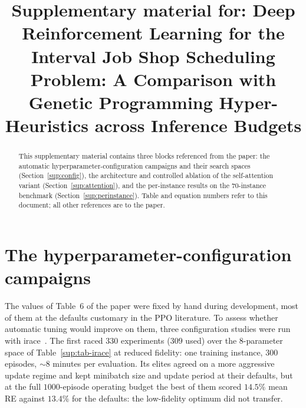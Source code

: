 \documentclass[preprint,12pt]{elsarticle}
\begin{document}
\begin{frontmatter}

\title{Supplementary material for: Deep Reinforcement Learning for
the Interval Job Shop Scheduling Problem: A Comparison with Genetic
Programming Hyper-Heuristics across Inference Budgets}

\begin{abstract}
This supplementary material contains three blocks
referenced from the paper: the automatic
hyperparameter-configuration campaigns and their search spaces
(Section~\ref{sup:config}), the architecture and controlled ablation
of the self-attention variant (Section~\ref{sup:attention}), and the
per-instance results on the 70-instance benchmark
(Section~\ref{sup:perinstance}). Table and equation numbers refer to
this document; all other references are to the paper.
\end{abstract}

\end{frontmatter}

\section{The hyperparameter-configuration campaigns}
\label{sup:config}

The values of Table~6 of the paper were fixed by hand during
development, most of them at the defaults customary in the PPO
literature. To assess whether automatic tuning would improve on them,
three configuration studies were run with
irace~\citep{LopezIbanez2016}. The first raced $330$ experiments
($309$ used) over the 8-parameter space of Table~\ref{sup:tab-irace}
at reduced fidelity: one training instance, $300$ episodes,
${\sim}8$ minutes per evaluation. Its elites agreed on a more
aggressive update regime and kept minibatch size and update period at
their defaults, but at the full $1000$-episode operating budget the
best of them scored $14.5\%$ mean RE against $13.4\%$ for the
defaults: the low-fidelity optimum did not transfer.
\end{document}
